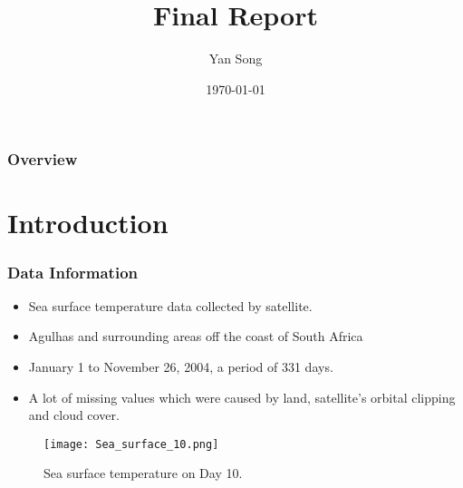 \documentclass{beamer}
\title[]{Final Report} %
\author{Yan Song} %
\institute[ISBD] %
{
ISBD \\ %
\medskip
}
\date{\today} %
\begin{document}
\begin{frame}
\titlepage %
\end{frame}

\begin{frame}
\frametitle{Overview} %
\tableofcontents %
\end{frame}


\section{Introduction}
\begin{frame}
\frametitle{Data Information}
\begin{itemize}
\item Sea surface temperature data collected by satellite.
\item Agulhas and surrounding areas off the coast of South Africa
\item January 1 to November 26, 2004, a period of 331 days.
\item A lot of missing values which were caused by land, satellite's orbital clipping and cloud cover.
\end{itemize}
\begin{figure}
\centering
\texttt{[image: Sea\_surface\_10.png]}
\caption{Sea surface temperature on Day 10.}
\label{Figure 1}
\end{figure}
\end{frame}
\end{document}
